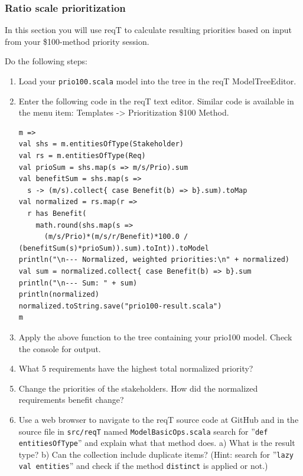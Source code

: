 \documentclass[11pt]{article}
\begin{document}
\subsubsection{Ratio scale prioritization}
In this section you will use reqT to calculate resulting priorities based on input from your \$100-method priority session. 
\begin{framed}
\noindent Do the following steps: 

\begin{enumerate}
\item Load your \verb+prio100.scala+ model into the tree in the reqT ModelTreeEditor.
\item Enter the following code in the reqT text editor. Similar code is available in the menu item:  Templates -> Prioritization \$100 Method.
\begin{lstlisting}
m =>    
val shs = m.entitiesOfType(Stakeholder)
val rs = m.entitiesOfType(Req)
val prioSum = shs.map(s => m/s/Prio).sum
val benefitSum = shs.map(s => 
  s -> (m/s).collect{ case Benefit(b) => b}.sum).toMap
val normalized = rs.map(r => 
  r has Benefit(
    math.round(shs.map(s => 
      (m/s/Prio)*(m/s/r/Benefit)*100.0 / (benefitSum(s)*prioSum)).sum).toInt)).toModel
println("\n--- Normalized, weighted priorities:\n" + normalized)
val sum = normalized.collect{ case Benefit(b) => b}.sum
println("\n--- Sum: " + sum)
println(normalized)
normalized.toString.save("prio100-result.scala")
m 
\end{lstlisting}
\item Apply the above function to the tree containing your prio100 model. Check the console for output.
\item What 5 requirements have the highest total normalized priority?
\vspace{4em}
\item Change the priorities of the stakeholders. How did the normalized requirements benefit change?
\vspace{4em}
\item Use a web browser to navigate to the reqT source code at GitHub and in the source file in \verb+src/reqT+ named \verb+ModelBasicOps.scala+ search for ''\verb+def entitiesOfType+'' and explain what that method does. \newline a) What is the result type? \vspace{1em}\newline b) Can the collection include duplicate items? (Hint: search for ''\verb+lazy val entities+'' and check if the method \verb+distinct+ is applied or not.)

\end{enumerate}
\end{framed}
\end{document}
